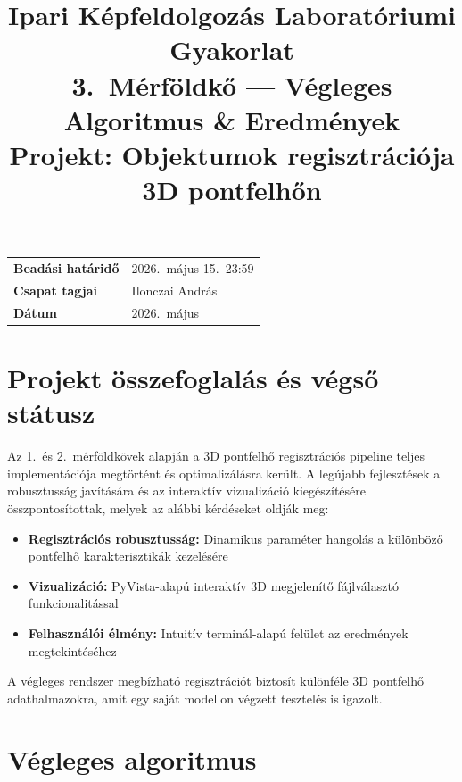 \documentclass[12pt,a4paper]{article}
\title{
    \textbf{Ipari Képfeldolgozás Laboratóriumi Gyakorlat} \\[0.3cm]
    \Large 3.~Mérföldkő — Végleges Algoritmus \& Eredmények \\[0.3cm]
    \large Projekt: Objektumok regisztrációja 3D pontfelhőn
}
\author{}
\date{}
\begin{document}
\maketitle
\thispagestyle{empty}

\vspace{-1.5cm}

\begin{table}[H]
\centering
\begin{tabular}{ll}
\toprule
\textbf{Beadási határidő} & 2026.~május 15.~23:59 \\
\textbf{Csapat tagjai}     & Ilonczai András \\
\textbf{Dátum}             & 2026.~május \\
\bottomrule
\end{tabular}
\end{table}

\section{Projekt összefoglalás és végső státusz}

Az 1.~és 2.~mérföldkövek alapján a 3D pontfelhő regisztrációs pipeline teljes implementációja megtörtént és optimalizálásra került. A legújabb fejlesztések a robusztusság javítására és az interaktív vizualizáció kiegészítésére összpontosítottak, melyek az alábbi kérdéseket oldják meg:

\begin{itemize}[nosep]
    \item \textbf{Regisztrációs robusztusság:} Dinamikus paraméter hangolás a különböző pontfelhő karakterisztikák kezelésére
    \item \textbf{Vizualizáció:} PyVista-alapú interaktív 3D megjelenítő fájlválasztó funkcionalitással
    \item \textbf{Felhasználói élmény:} Intuitív terminál-alapú felület az eredmények megtekintéséhez
\end{itemize}

A végleges rendszer megbízható regisztrációt biztosít különféle 3D pontfelhő adathalmazokra, amit egy saját modellon végzett tesztelés is igazolt.

\section{Végleges algoritmus}
\end{document}
